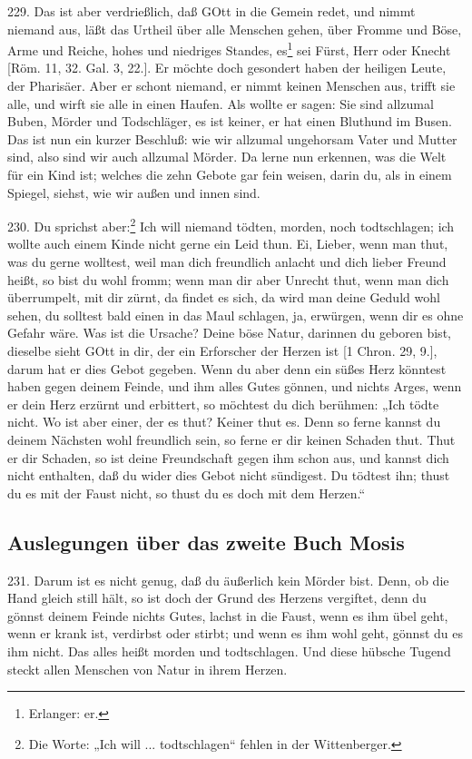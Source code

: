 229. Das ist aber verdrießlich, daß GOtt in die Gemein redet, und nimmt niemand aus, läßt das Urtheil über alle Menschen gehen, über Fromme und Böse, Arme und Reiche, hohes und niedriges Standes, es\footnote{Erlanger: er.} sei Fürst, Herr oder Knecht [Röm. 11, 32. Gal. 3, 22.]. Er möchte doch gesondert haben der heiligen Leute, der Pharisäer. Aber er schont niemand, er nimmt keinen Menschen aus, trifft sie alle, und wirft sie alle in einen Haufen. Als wollte er sagen: Sie sind allzumal Buben, Mörder und Todschläger, es ist keiner, er hat einen Bluthund im Busen. Das ist nun ein kurzer Beschluß: wie wir allzumal ungehorsam Vater und Mutter sind, also sind wir auch allzumal Mörder. Da lerne nun erkennen, was die Welt für ein Kind ist; welches die zehn Gebote gar fein weisen, darin du, als in einem Spiegel, siehst, wie wir außen und innen sind.

230. Du sprichst aber:\footnote{Die Worte: „Ich will ... todtschlagen“ fehlen in der Wittenberger.} Ich will niemand tödten, morden, noch todtschlagen; ich wollte auch einem Kinde nicht gerne ein Leid thun. Ei, Lieber, wenn man thut, was du gerne wolltest, weil man dich freundlich anlacht und dich lieber Freund heißt, so bist du wohl fromm; wenn man dir aber Unrecht thut, wenn man dich überrumpelt, mit dir zürnt, da findet es sich, da wird man deine Geduld wohl sehen, du solltest bald einen in das Maul schlagen, ja, erwürgen, wenn dir es ohne Gefahr wäre. Was ist die Ursache? Deine böse Natur, darinnen du geboren bist, dieselbe sieht GOtt in dir, der ein Erforscher der Herzen ist [1 Chron. 29, 9.], darum hat er dies Gebot gegeben. Wenn du aber denn ein süßes Herz könntest haben gegen deinem Feinde, und ihm alles Gutes gönnen, und nichts Arges, wenn er dein Herz erzürnt und erbittert, so möchtest du dich berühmen: „Ich tödte nicht. Wo ist aber einer, der es thut? Keiner thut es. Denn so ferne kannst du deinem Nächsten wohl freundlich sein, so ferne er dir keinen Schaden thut. Thut er dir Schaden, so ist deine Freundschaft gegen ihm schon aus, und kannst dich nicht enthalten, daß du wider dies Gebot nicht sündigest. Du tödtest ihn; thust du es mit der Faust nicht, so thust du es doch mit dem Herzen.“

\subsection{Auslegungen über das zweite Buch Mosis}

231. Darum ist es nicht genug, daß du äußerlich kein Mörder bist. Denn, ob die Hand gleich still hält, so ist doch der Grund des Herzens vergiftet, denn du gönnst deinem Feinde nichts Gutes, lachst in die Faust, wenn es ihm übel geht, wenn er krank ist, verdirbst oder stirbt; und wenn es ihm wohl geht, gönnst du es ihm nicht. Das alles heißt morden und todtschlagen. Und diese hübsche Tugend steckt allen Menschen von Natur in ihrem Herzen.

